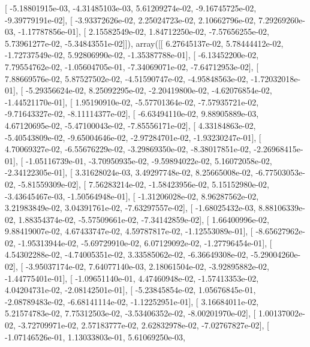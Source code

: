 \documentclass{article}
\begin{document}
       [ -5.18801915e-03,  -4.31485103e-03,   5.61209274e-02,
         -9.16745725e-02,  -9.39779191e-02],
       [ -3.93372626e-02,   2.25024723e-02,   2.10662796e-02,
          7.29269260e-03,  -1.17787856e-01],
       [  2.15582549e-02,   1.84712250e-02,  -7.57656255e-02,
          5.73961277e-02,  -5.34843551e-02]]), array([[  6.27645137e-02,   5.78444412e-02,  -1.72737549e-02,
          5.92806990e-02,  -1.35387788e-01],
       [ -6.13452200e-02,   7.79554762e-02,  -1.05604705e-01,
         -7.34069071e-02,  -7.64712953e-02],
       [  7.88669576e-02,   5.87527502e-02,  -4.51590747e-02,
         -4.95848563e-02,  -1.72032018e-01],
       [ -5.29356624e-02,   8.25092295e-02,  -2.20419800e-02,
         -4.62076854e-02,  -1.44521170e-01],
       [  1.95190910e-02,  -5.57701364e-02,  -7.57935721e-02,
         -9.71643327e-02,  -8.11114377e-02],
       [ -6.63494110e-02,   9.88905889e-03,   4.67120695e-02,
         -5.47100043e-02,  -7.85556171e-02],
       [  4.33184863e-02,  -5.40543809e-02,  -9.65004646e-02,
         -2.97284701e-02,  -1.93230247e-01],
       [  4.70069327e-02,  -6.55676229e-02,  -3.29869350e-02,
         -8.38017851e-02,  -2.26968415e-01],
       [ -1.05116739e-01,  -3.70950935e-02,  -9.59894022e-02,
          5.16072058e-02,  -2.34122305e-01],
       [  3.31628024e-03,   3.49297748e-02,   8.25665008e-02,
         -6.77503053e-02,  -5.81559309e-02],
       [  7.56283214e-02,  -1.58423956e-02,   5.15152980e-02,
         -3.43645467e-03,  -1.50564948e-01],
       [ -1.31206028e-02,   8.96287562e-02,   3.21983849e-02,
          3.04391761e-02,  -7.63297557e-02],
       [ -1.68025432e-03,   8.88106339e-02,   1.88354374e-02,
         -5.57509661e-02,  -7.34142859e-02],
       [  1.66400996e-02,   9.88419007e-02,   4.67433747e-02,
          4.59787817e-02,  -1.12553089e-01],
       [ -8.65627962e-02,  -1.95313944e-02,  -5.69729910e-02,
          6.07129092e-02,  -1.27796454e-01],
       [  4.54302288e-02,  -4.74005351e-02,   3.33585062e-02,
         -6.36649308e-02,  -5.29004260e-02],
       [ -3.95037174e-02,   7.64077140e-03,   2.18061504e-02,
         -3.92895882e-02,  -1.44775401e-01],
       [ -1.09651140e-01,   4.47460948e-02,  -1.57413353e-02,
          4.04204731e-02,  -2.08142501e-01],
       [ -5.23845854e-02,   1.05676845e-01,  -2.08789483e-02,
         -6.68141114e-02,  -1.12252951e-01],
       [  3.16684011e-02,   5.21574783e-02,   7.75312503e-02,
         -3.53406352e-02,  -8.00201970e-02],
       [  1.00137002e-02,  -3.72709971e-02,   2.57183777e-02,
          2.62832978e-02,  -7.02767827e-02],
       [ -1.07146526e-01,   1.13033803e-01,   5.61069250e-03,
\end{document}
